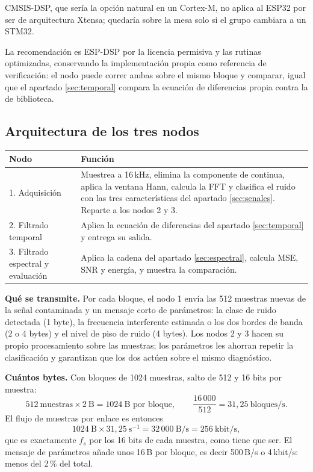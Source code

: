 CMSIS-DSP, que sería la opción natural en un Cortex-M, no aplica al ESP32 por ser
de arquitectura Xtensa; quedaría sobre la mesa solo si el grupo cambiara a un
STM32.

La recomendación es ESP-DSP por la licencia permisiva y las rutinas optimizadas,
conservando la implementación propia como referencia de verificación: el nodo
puede correr ambas sobre el mismo bloque y comparar, igual que el apartado
\ref{sec:temporal} compara la ecuación de diferencias propia contra la de
biblioteca.

\subsection{Arquitectura de los tres nodos}

\begin{center}\small
\begin{tabular}{lp{10.2cm}}
\toprule
Nodo & Función \\
\midrule
1. Adquisición & Muestrea a 16\,kHz, elimina la componente de continua, aplica la ventana Hann, calcula la FFT y clasifica el ruido con las tres características del apartado \ref{sec:senales}. Reparte a los nodos 2 y 3. \\
2. Filtrado temporal & Aplica la ecuación de diferencias del apartado \ref{sec:temporal} y entrega su salida. \\
3. Filtrado espectral y evaluación & Aplica la cadena del apartado \ref{sec:espectral}, calcula MSE, SNR y energía, y muestra la comparación. \\
\bottomrule
\end{tabular}
\end{center}

\textbf{Qué se transmite.} Por cada bloque, el nodo 1 envía las 512 muestras
nuevas de la señal contaminada y un mensaje corto de parámetros: la clase de
ruido detectada (1 byte), la frecuencia interferente estimada o los dos bordes de
banda (2 o 4 bytes) y el nivel de piso de ruido (4 bytes). Los nodos 2 y 3 hacen
su propio procesamiento sobre las muestras; los parámetros les ahorran repetir la
clasificación y garantizan que los dos actúen sobre el mismo diagnóstico.

\textbf{Cuántos bytes.} Con bloques de 1024 muestras, salto de 512 y 16 bits por
muestra:
\[
512\ \text{muestras}\times 2\ \text{B} = 1024\ \text{B por bloque},
\qquad
\frac{16\,000}{512} = 31{,}25\ \text{bloques/s}.
\]
El flujo de muestras por enlace es entonces
\[
1024\ \text{B}\times 31{,}25\ \text{s}^{-1} = 32\,000\ \text{B/s} = 256\ \text{kbit/s},
\]
que es exactamente $f_s$ por los 16 bits de cada muestra, como tiene que ser. El
mensaje de parámetros añade unos 16\,B por bloque, es decir 500\,B/s o 4\,kbit/s:
menos del 2\,\% del total.

